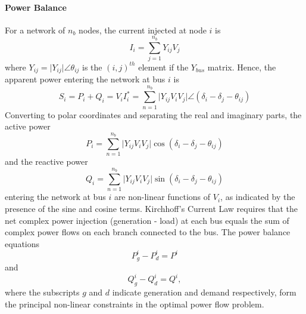 \paragraph{Power Balance}
For a network of $n_b$ nodes, the current injected at
node $i$ is
\begin{equation}
I_i = \sum_{j=1}^{n_b} Y_{ij} V_j
\end{equation}
where $Y_{ij} = \vert Y_{ij}\vert \angle\theta_{ij}$ is the $(i,j)^{th}$ element
if the $Y_{bus}$ matrix.  Hence, the apparent power entering
the network at bus $i$ is
\begin{equation}
S_i = P_i+Q_i = V_iI_i^* = \sum_{n=1}^{n_b} \vert Y_{ij}V_iV_j \vert \angle
(\delta_i - \delta_j - \theta_{ij})
\end{equation}
Converting to polar coordinates and separating the real and imaginary parts,
the active power
\begin{equation}
P_i = \sum_{n=1}^{n_b} \vert Y_{ij}V_iV_j \vert \cos(\delta_i - \delta_j -
\theta_{ij})
\end{equation}
and the reactive power
\begin{equation}
Q_i = \sum_{n=1}^{n_b} \vert Y_{ij}V_iV_j \vert \sin(\delta_i - \delta_j -
\theta_{ij})
\end{equation}
entering the network at bus $i$ are non-linear functions of $V_i$, as indicated
by the presence of the sine and cosine terms.  Kirchhoff's Current Law requires
that the net complex power injection (generation - load) at each bus equals the sum of
complex power flows on each branch connected to the bus.  The power balance
equations
\begin{equation}
\label{eq:p_balance}
P_g^i - P_d^i = P^i
\end{equation}
and
\begin{equation}
\label{eq:q_balance}
Q_g^i - Q_d^i = Q^i,
\end{equation}
where the subscripts $g$ and $d$ indicate generation and demand
respectively, form the principal non-linear constraints in the optimal power
flow problem.

